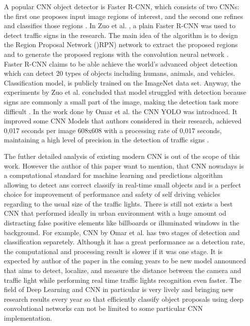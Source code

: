 \documentclass[letterpaper, 10 pt, conference]{ieeeconf} %
\begin{document}
A popular CNN object detector is Faster R-CNN, which consists of two CNNs: the first one proposes input image regions of interest, and the second one refines and classifies those regions \cite{c7}. In Zuo et al. \cite{c9}, a plain Faster R-CNN was used to detect traffic signs in the research. The main idea of the algorithm is to design the Region Proposal Network ()RPN) network to extract the proposed regions and to generate the proposed regions with the convolution neural network \cite{c9}. Faster R-CNN claims to be able achieve the world's advanced object detection which can detect 20 types of objects including humans, animals, and vehicles. Classification model, is publicly trained on the ImageNet data set. Anyway, the experiments by Zuo et al. concluded that model struggled with detection because signs are commonly a small part of the image, making the detection task more difficult \cite{c7}. In the work done by Omar et al. the CNN YOLO was introduced. It improved some CNN Models that authors considered in their research, achieved 0,017 seconds per image 608x608 with a processing rate of 0,017 seconds, maintaining a high level of precision in the detection of traffic signs \cite{c7}. 

The futher detailed analysis of existing modern CNN is out of the scope of this work. However the author of this paper want to mention, that CNN nowadays is a computational standard for machine learning and predictions algorithm allowing to detect ans correct classify in real-time small objects and is a perfect choice for improvement of performance and safety of self driving vehicles regarding to the usual size of the traffic lights. There is still not exists a best CNN that performed ideally in urban environment with a huge amount od distracting false positive elements like billboards or illuminated windows in the background. For example, CNN by Omar et al. has two stages of detection and classification separetely. Although it has a great performance as a detection rate, the computational and processing result is slower if it was one stage. It is expected by author of the paper in the coming years to be new model announced that aims to detect, localize, and measure the distance between the camera and traffic light while performing real time traffic lights recognition even faster. The field of Deep Learning and CNN in particular is very lively and bringing new research results every year so that efficiently classify object proposals using deep convolutional networks can not be limited to some particular CNN implementation. 
\end{document}

